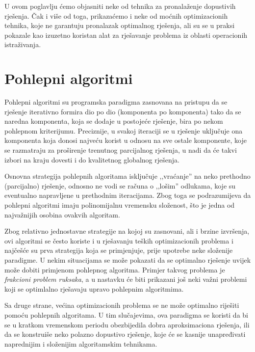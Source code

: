 \documentclass[a4paper, utf8, 11pt, colorlinks]{book}
\theoremstyle{definition}
\begin{document}
 U ovom poglavlju ćemo objasniti neke od tehnika za pronalaženje dopustivih rješenja. Čak i više od toga, prikazaćemo i neke od moćnih optimizacionih tehnika, koje ne garantuju  pronalazak optimalnog rješenja, ali su se u praksi pokazale kao izuzetno koristan alat za rješavanje problema iz oblasti operacionih istraživanja.
 

\section{Pohlepni algoritmi}
 
Pohlepni algoritmi su programska paradigma zasnovana na pristupu da se  rješenje iterativno formira dio po dio (komponenta po komponenta) tako da se naredna komponenta, koja se dodaje u postojeće rješenje, bira 
 po nekom pohlepnom kriterijumu. Preciznije, u svakoj iteraciji se u rješenje uključuje ona komponenta koja donosi najveću korist u odnosu na sve ostale komponente, koje se razmatraju za proširenje  trenutnog parcijalnog rješenja, u nadi da će takvi izbori na kraju dovesti i do kvalitetnog globalnog rješenja.
 
 
 Osnovna strategija pohlepnih algoritama isključuje ,,vraćanje'' na neko prethodno (parcijalno) rješenje, odnosno ne vodi se računa o ,,lošim'' odlukama, koje su eventualno napravljene u prethodnim iteracijama. Zbog toga se podrazumijeva da pohlepni algoritmi imaju polinomijalnu vremensku složenost, što je jedna od najvažnijih osobina ovakvih algoritam.
 
 Zbog relativno jednostavne strategije na kojoj su zasnovani, ali i brzine izvršenja, ovi algoritmi se često koriste i u rješavanju teških optimizacionih problema i najčešće su prva strategija koja se primjenjuje, prije 
upotrebe neke složenije paradigme. 
U nekim situacijama se može pokazati da se optimalno rješenje uvijek može dobiti primjenom pohlepnog algoritma. Primjer takvog problema je \emph{frakcioni problem ruksaka}, a u nastavku će biti prikazani još neki važni problemi koji se optimlalno rješavaju upravo pohlepnim algoritmima.
 
Sa druge strane, većina optimizacionih problema se ne može optimalno riješiti pomoću pohlepnih algoritama. U tim slučajevima, ova paradigma se koristi da bi se u kratkom vremenskom periodu obezbijedila dobra aproksimaciona rješenja, ili da se konstruiše neko polazno dopustivo rješenje, koje će se kasnije unapređivati naprednijim i složenijim algoritamskim tehnikama. 
\end{document}
